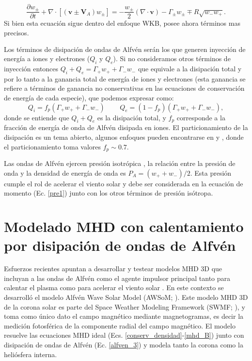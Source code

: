 \documentclass[a4paper,11pt]{report}
\begin{document}
\begin{equation}
  \frac{\partial w_\pm}{\partial t} + \nabla \cdot [(\boldsymbol{v}\pm \boldsymbol{V}_A)w_\pm] = - \frac{w_\pm}{2}(\nabla \cdot \boldsymbol{v}) - \Gamma_{\pm} w_\pm \mp R\sqrt{w_- w_+}.\label{alfven_3}
\end{equation}
Si bien esta ecuación sigue dentro del enfoque WKB, posee ahora términos mas precisos.

Los términos de disipación de ondas de Alfvén serán los que generen inyección de energía a iones y electrones ($Q_i$ y $Q_e$). Si no consideramos otros términos de inyección entonces $Q_i + Q_e = \Gamma_+ w_+ + \Gamma_- w_-$ que equivale a la disipación total y por lo tanto a la ganancia total de energía de iones y electrones (esta ganancia se refiere a términos de ganancia no conservativas en las ecuaciones de conservación de energía de cada especie), que podemos expresar como:
\begin{equation}
  Q_i = f_p(\Gamma_+ w_+ + \Gamma_- w_-) \,\,\,\,\,\,\,\,\,\,\,\,\, Q_e = (1-f_p)(\Gamma_+ w_+ + \Gamma_- w_-),
\end{equation}
donde se entiende que $Q_i + Q_e$ es la disipación total, y $f_p$ corresponde a la fracción de energía de onda de Alfvén disipada en iones. El particionamiento de la disipación es un tema abierto, algunos enfoques pueden encontrarse en \citet{hollweg_1986} y \citet{vander_2014}, donde el particionamiento toma valores $f_p \sim 0.7$. 

Las ondas de Alfvén ejercen presión isotrópica \citep{jacques_1977}, la relación entre la presión de onda y la densidad de energía de onda es $P_A = (w_+ + w_-)/2$. Esta presión cumple el rol de acelerar el viento solar y debe ser considerada en la ecuación de momento (Ec. \ref{pre1}) junto con los otros términos de presión isótropa.


\section{Modelado MHD con calentamiento por disipación de ondas de Alfvén}

Esfuerzos recientes apuntan a desarrollar y testear modelos MHD 3D que incluyan a las ondas de Alfvén como el agente impulsor principal tanto para calentar el plasma como para acelerar el viento solar \citep{gombosi_2018}. En este contexto se desarrolló el modelo Alfvén Wave Solar Model (AWSoM;  \citet{vander_2014}). Este modelo MHD 3D de la corona solar es parte del Space Weather Modeling Framework (SWMF; \citet{swmf_2005}), y toma como único dato el campo magnético mediante magnetogramas, es decir la medición fotosférica de la componente radial del campo magnético. El modelo resuelve las ecuaciones MHD ideal (Ecs. \ref{conserv_densidad}-\ref{mhd_B}) junto con disipación de ondas de Alfvén (Ec. \ref{alfven_3}) y modela tanto la corona como la heliósfera interna.
\end{document}
